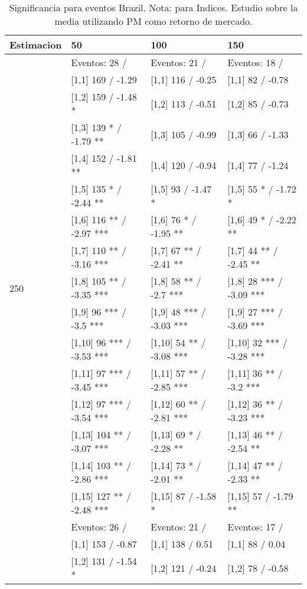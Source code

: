 \begin{table}

\caption{Significancia para eventos Brazil. Nota: para Indices. Estudio sobre la media utilizando PM como retorno de mercado.}
\centering
\begin{tabular}[t]{llll}
\toprule
Estimacion & 50 & 100 & 150\\
\midrule
 & Eventos:  28 / & Eventos:  21 / & Eventos:  18 /\\
 & {}[1,1] 169  / -1.29 & {}[1,1] 116  / -0.25 & {}[1,1] 82  / -0.78\\
 & {}[1,2] 159  / -1.48 * & {}[1,2] 113  / -0.51 & {}[1,2] 85  / -0.73\\
 & {}[1,3] 139 * / -1.79 ** & {}[1,3] 105  / -0.99 & {}[1,3] 66  / -1.33\\
 & {}[1,4] 152  / -1.81 ** & {}[1,4] 120  / -0.94 & {}[1,4] 77  / -1.24\\
\addlinespace
 & {}[1,5] 135 * / -2.44 ** & {}[1,5] 93  / -1.47 * & {}[1,5] 55 * / -1.72 *\\
 & {}[1,6] 116 ** / -2.97 *** & {}[1,6] 76 * / -1.95 ** & {}[1,6] 49 * / -2.22 **\\
 & {}[1,7] 110 ** / -3.16 *** & {}[1,7] 67 ** / -2.41 ** & {}[1,7] 44 ** / -2.45 **\\
250 & {}[1,8] 105 ** / -3.35 *** & {}[1,8] 58 ** / -2.7 *** & {}[1,8] 28 *** / -3.09 ***\\
 & {}[1,9] 96 *** / -3.5 *** & {}[1,9] 48 *** / -3.03 *** & {}[1,9] 27 *** / -3.69 ***\\
\addlinespace
 & {}[1,10] 96 *** / -3.53 *** & {}[1,10] 54 ** / -3.08 *** & {}[1,10] 32 *** / -3.28 ***\\
 & {}[1,11] 97 *** / -3.45 *** & {}[1,11] 57 ** / -2.85 *** & {}[1,11] 36 ** / -3.2 ***\\
 & {}[1,12] 97 *** / -3.54 *** & {}[1,12] 60 ** / -2.81 *** & {}[1,12] 36 ** / -3.23 ***\\
 & {}[1,13] 104 ** / -3.07 *** & {}[1,13] 69 * / -2.28 ** & {}[1,13] 46 ** / -2.54 **\\
 & {}[1,14] 103 ** / -2.86 *** & {}[1,14] 73 * / -2.01 ** & {}[1,14] 47 ** / -2.33 **\\
\addlinespace
 & {}[1,15] 127 ** / -2.48 *** & {}[1,15] 87  / -1.58 * & {}[1,15] 57  / -1.79 **\\
 & Eventos:  26 / & Eventos:  21 / & Eventos:  17 /\\
 & {}[1,1] 153  / -0.87 & {}[1,1] 138  / 0.51 & {}[1,1] 88  / 0.04\\
 & {}[1,2] 131  / -1.54 * & {}[1,2] 121  / -0.24 & {}[1,2] 78  / -0.58\\

\end{tabular}
\end{table}

